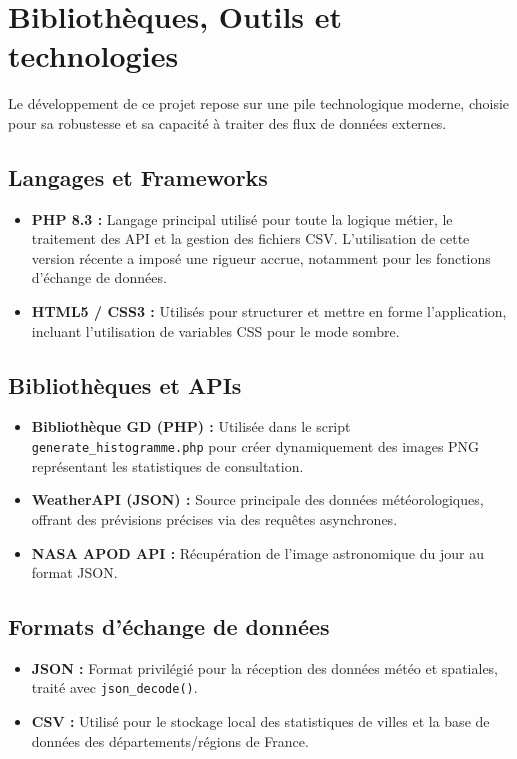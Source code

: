 \documentclass[12pt,a4paper]{article}
\begin{document}
\section{Bibliothèques, Outils et technologies}

Le développement de ce projet repose sur une pile technologique moderne, choisie pour sa robustesse et sa capacité à traiter des flux de données externes.

\subsection{Langages et Frameworks}
\begin{itemize}
    \item \textbf{PHP 8.3 :} Langage principal utilisé pour toute la logique métier, le traitement des API et la gestion des fichiers CSV. L'utilisation de cette version récente a imposé une rigueur accrue, notamment pour les fonctions d'échange de données.
    \item \textbf{HTML5 / CSS3 :} Utilisés pour structurer et mettre en forme l'application, incluant l'utilisation de variables CSS pour le mode sombre.
\end{itemize}

\subsection{Bibliothèques et APIs}
\begin{itemize}
    \item \textbf{Bibliothèque GD (PHP) :} Utilisée dans le script \texttt{generate\_histogramme.php} pour créer dynamiquement des images PNG représentant les statistiques de consultation.
    \item \textbf{WeatherAPI (JSON) :} Source principale des données météorologiques, offrant des prévisions précises via des requêtes asynchrones.
    \item \textbf{NASA APOD API :} Récupération de l'image astronomique du jour au format JSON.
\end{itemize}

\subsection{Formats d'échange de données}
\begin{itemize}
    \item \textbf{JSON :} Format privilégié pour la réception des données météo et spatiales, traité avec \texttt{json\_decode()}.
    \item \textbf{CSV :} Utilisé pour le stockage local des statistiques de villes et la base de données des départements/régions de France.
\end{itemize}
\end{document}
